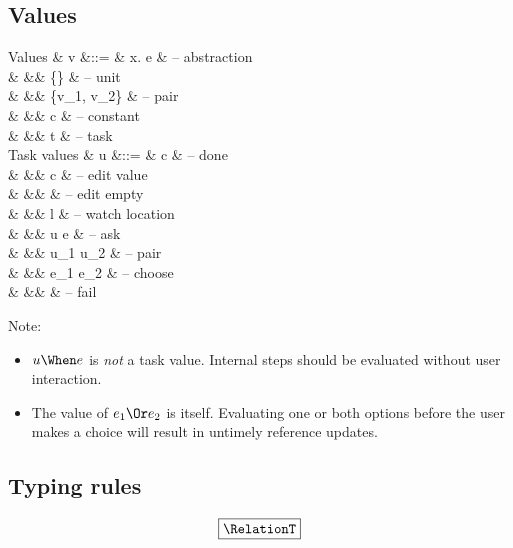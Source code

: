 \subsection{Values}

\begin{grammar}
  Values
    & v      &::= & \lambda x. e                & – abstraction \\
    &        &\mid& \{\}                        & – unit \\
    &        &\mid& \{v_1, v_2\}                & – pair \\
    &        &\mid& c                           & – constant \\
    &        &\mid& t                           & – task \\
  Task values
    & u      &::= & \Done c                     & – done \\
    &        &\mid& \Edit c                     & – edit value \\
    &        &\mid& \Empty \beta                & – edit empty \\
    &        &\mid& \Watch l                    & – watch location \\
    &        &\mid& u \Then e                   & – ask \\
    &        &\mid& u_1 \And u_2                & – pair \\
    &        &\mid& e_1 \Or e_2                 & – choose \\
    &        &\mid& \Fail                       & – fail \\
\end{grammar}

Note:
\begin{itemize}
  \item $u \When e$ is \emph{not} a task value.
    Internal steps should be evaluated without user interaction.
  \item The value of $e_1 \Or e_2$ is itself.
    Evaluating one or both options before the user makes a choice will result in untimely reference updates.
\end{itemize}


\statefultrue


\newpage
\subsection{Typing rules}

\begin{equation*}
  \boxed{\RelationT}
\end{equation*}

